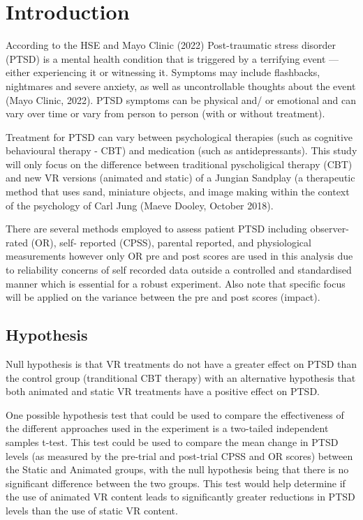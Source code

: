 \documentclass[
  10pt,
]{article}
\begin{document}
\hypertarget{introduction}{%
\section{Introduction}\label{introduction}}

According to the HSE and Mayo Clinic (2022) Post-traumatic stress
disorder (PTSD) is a mental health condition that is triggered by a
terrifying event --- either experiencing it or witnessing it. Symptoms
may include flashbacks, nightmares and severe anxiety, as well as
uncontrollable thoughts about the event (Mayo Clinic, 2022). PTSD
symptoms can be physical and/ or emotional and can vary over time or
vary from person to person (with or without treatment).

Treatment for PTSD can vary between psychological therapies (such as
cognitive behavioural therapy - CBT) and medication (such as
antidepressants). This study will only focus on the difference between
traditional pyscholigical therapy (CBT) and new VR versions (animated
and static) of a Jungian Sandplay (a therapeutic method that uses sand,
miniature objects, and image making within the context of the psychology
of Carl Jung (Maeve Dooley, October 2018).

There are several methods employed to assess patient PTSD including
observer-rated (OR), self- reported (CPSS), parental reported, and
physiological measurements however only OR pre and post scores are used
in this analysis due to reliability concerns of self recorded data
outside a controlled and standardised manner which is essential for a
robust experiment. Also note that specific focus will be applied on the
variance between the pre and post scores (impact).

\hypertarget{hypothesis}{%
\subsection{Hypothesis}\label{hypothesis}}

Null hypothesis is that VR treatments do not have a greater effect on
PTSD than the control group (tranditional CBT therapy) with an
alternative hypothesis that both animated and static VR treatments have
a positive effect on PTSD.

One possible hypothesis test that could be used to compare the
effectiveness of the different approaches used in the experiment is a
two-tailed independent samples t-test. This test could be used to
compare the mean change in PTSD levels (as measured by the pre-trial and
post-trial CPSS and OR scores) between the Static and Animated groups,
with the null hypothesis being that there is no significant difference
between the two groups. This test would help determine if the use of
animated VR content leads to significantly greater reductions in PTSD
levels than the use of static VR content.
\end{document}
